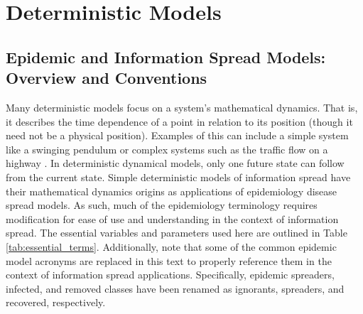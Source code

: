 \chapter{Deterministic Models} \label{ch:DETERMINISTIC}

\section{Epidemic and Information Spread Models: Overview and Conventions}

Many deterministic models focus on a system's mathematical dynamics. That is, it describes the time dependence of a point in relation to its position (though it need not be a physical position). Examples of this can include a simple system like a swinging pendulum or complex systems such as the traffic flow on a highway \cite{contreras2016observability}. In deterministic dynamical models, only one future state can follow from the current state. Simple deterministic models of information spread have their mathematical dynamics origins as applications of epidemiology disease spread models. As such, much of the epidemiology terminology requires modification for ease of use and understanding in the context of information spread. The essential variables and parameters used here are outlined in Table \ref{tab:essential_terms}. 
Additionally, note that some of the common epidemic model acronyms are replaced in this text to properly reference them in the context of information spread applications. Specifically, epidemic spreaders, infected, and removed classes have been renamed as ignorants, spreaders, and recovered, respectively. 

